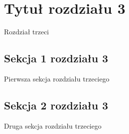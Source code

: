 \chapter{Tytuł rozdziału 3}

Rozdział trzeci

\section{Sekcja 1 rozdziału 3}

Pierwsza sekcja rozdziału trzeciego

\section{Sekcja 2 rozdziału 3}

Druga sekcja rozdziału trzeciego
